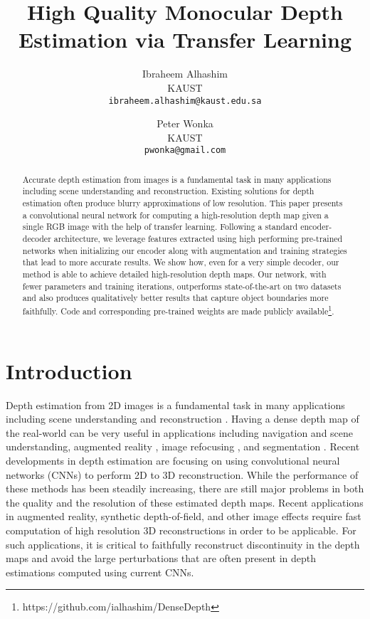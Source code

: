 \documentclass[10pt,twocolumn,letterpaper]{article}
\begin{document}
\title{High Quality Monocular Depth Estimation via Transfer Learning}

\author{Ibraheem Alhashim\\
KAUST\\
{\tt\small ibraheem.alhashim@kaust.edu.sa}
\and
Peter Wonka\\
KAUST\\
{\tt\small pwonka@gmail.com}
}

\maketitle


\begin{abstract}
    Accurate depth estimation from images is a fundamental task in many applications including scene understanding and reconstruction. Existing solutions for depth estimation often produce blurry approximations of low resolution.
    This paper presents a convolutional neural network for computing a high-resolution depth map given a single RGB image with the help of transfer learning. Following a standard encoder-decoder architecture, we leverage features extracted using high performing pre-trained networks when initializing our encoder along with augmentation and training strategies that lead to more accurate results. We show how, even for a very simple decoder, our method is able to achieve detailed high-resolution depth maps. Our network, with fewer parameters and training iterations, outperforms state-of-the-art on two datasets and also produces qualitatively better results that capture object boundaries more faithfully. Code and corresponding pre-trained weights are made publicly available\footnote{https://github.com/ialhashim/DenseDepth}.
\end{abstract}



\section{Introduction}



Depth estimation from 2D images is a fundamental task in many applications including scene understanding and reconstruction \cite{Lee2011,moreno2007active,Hazirbas2016FuseNetID}. Having a dense depth map of the real-world can be very useful in applications including navigation and scene understanding, augmented reality \cite{Lee2011}, image refocusing \cite{moreno2007active}, and segmentation \cite{Hazirbas2016FuseNetID}. Recent developments in depth estimation are focusing on using convolutional neural networks (CNNs) to perform 2D to 3D reconstruction.
While the performance of these methods has been steadily increasing, there are still major problems in both the quality and the resolution of these estimated depth maps.
Recent applications in augmented reality, synthetic depth-of-field, and other image effects \cite{Hedman2018,Cao2018,Wang2018} require fast computation of high resolution 3D reconstructions in order to be applicable. For such applications, it is critical to faithfully reconstruct discontinuity in the depth maps and avoid the large perturbations that are often present in depth estimations computed using current CNNs.
\end{document}
